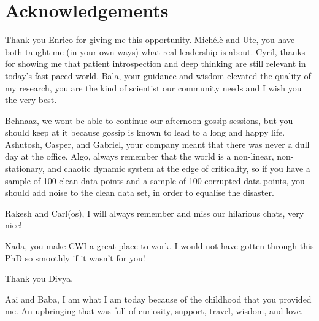 \chapter*{Acknowledgements}\label{chapter:preface}

Thank you Enrico for giving me this opportunity. Mich\'el\`e and Ute, you have 
both taught me (in your own ways) what real leadership is about. Cyril, 
thanks for showing me that patient introspection and deep thinking are still 
relevant in today's fast paced world. Bala, your guidance and wisdom elevated 
the quality of my research, you are the kind of scientist our community needs 
and I wish you the very best.

Behnaaz, we wont be able to continue our afternoon gossip sessions, but you 
should keep at it because gossip is known to lead to a long and happy life. 
Ashutosh, Casper, and Gabriel, your company meant that there was never a dull 
day at the office. Algo, always remember that the world is a non-linear, 
non-stationary, and chaotic dynamic system at the edge of criticality, so if 
you have a sample of 100 clean data points and a sample of 100 corrupted data 
points, you should add noise to the clean data set, in order to equalise the 
disaster.

Rakesh and Carl(os), I will always remember and miss our hilarious chats, very 
nice!

Nada, you make CWI a great place to work. I would not have gotten through this 
PhD so smoothly if it wasn't for you!  

Thank you Divya.

Aai and Baba, I am what I am today because of the childhood that you provided 
me. An upbringing that was full of curiosity, support, travel, wisdom, and love.